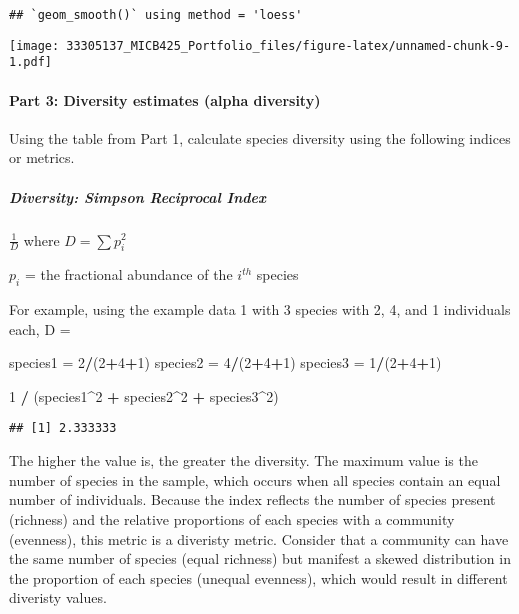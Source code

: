 \documentclass[]{article}
\newenvironment{Shaded}{\begin{snugshade}}{\end{snugshade}}
\newcommand{\DecValTok}[1]{\textcolor[rgb]{0.00,0.00,0.81}{#1}}
\newcommand{\StringTok}[1]{\textcolor[rgb]{0.31,0.60,0.02}{#1}}
\newcommand{\OperatorTok}[1]{\textcolor[rgb]{0.81,0.36,0.00}{\textbf{#1}}}
\newcommand{\NormalTok}[1]{#1}
\let\oldparagraph\paragraph
\renewcommand{\paragraph}[1]{\oldparagraph{#1}\mbox{}}
\let\oldsubparagraph\subparagraph
\renewcommand{\subparagraph}[1]{\oldsubparagraph{#1}\mbox{}}
\begin{document}
\begin{verbatim}
## `geom_smooth()` using method = 'loess'
\end{verbatim}

\texttt{[image: 33305137\_MICB425\_Portfolio\_files/figure-latex/unnamed-chunk-9-1.pdf]}

\paragraph{Part 3: Diversity estimates (alpha
diversity)}\label{part-3-diversity-estimates-alpha-diversity}

Using the table from Part 1, calculate species diversity using the
following indices or metrics.

\subparagraph{Diversity: Simpson Reciprocal
Index}\label{diversity-simpson-reciprocal-index}

\(\frac{1}{D}\) where \(D = \sum p_i^2\)

\(p_i\) = the fractional abundance of the \(i^{th}\) species

For example, using the example data 1 with 3 species with 2, 4, and 1
individuals each, D =

\begin{Shaded}
\begin{Highlighting}[]
\NormalTok{species1 =}\StringTok{ }\DecValTok{2}\OperatorTok{/}\NormalTok{(}\DecValTok{2}\OperatorTok{+}\DecValTok{4}\OperatorTok{+}\DecValTok{1}\NormalTok{)}
\NormalTok{species2 =}\StringTok{ }\DecValTok{4}\OperatorTok{/}\NormalTok{(}\DecValTok{2}\OperatorTok{+}\DecValTok{4}\OperatorTok{+}\DecValTok{1}\NormalTok{)}
\NormalTok{species3 =}\StringTok{ }\DecValTok{1}\OperatorTok{/}\NormalTok{(}\DecValTok{2}\OperatorTok{+}\DecValTok{4}\OperatorTok{+}\DecValTok{1}\NormalTok{)}

\DecValTok{1} \OperatorTok{/}\StringTok{ }\NormalTok{(species1}\OperatorTok{^}\DecValTok{2} \OperatorTok{+}\StringTok{ }\NormalTok{species2}\OperatorTok{^}\DecValTok{2} \OperatorTok{+}\StringTok{ }\NormalTok{species3}\OperatorTok{^}\DecValTok{2}\NormalTok{)}
\end{Highlighting}
\end{Shaded}

\begin{verbatim}
## [1] 2.333333
\end{verbatim}

The higher the value is, the greater the diversity. The maximum value is
the number of species in the sample, which occurs when all species
contain an equal number of individuals. Because the index reflects the
number of species present (richness) and the relative proportions of
each species with a community (evenness), this metric is a diveristy
metric. Consider that a community can have the same number of species
(equal richness) but manifest a skewed distribution in the proportion of
each species (unequal evenness), which would result in different
diveristy values.
\end{document}
